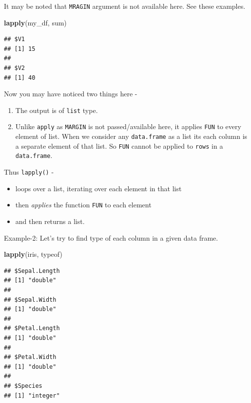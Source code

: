 \documentclass[
]{book}
\newenvironment{Shaded}{\begin{snugshade}}{\end{snugshade}}
\newcommand{\FunctionTok}[1]{\textcolor[rgb]{0.13,0.29,0.53}{\textbf{#1}}}
\newcommand{\NormalTok}[1]{#1}
\providecommand{\tightlist}{%
  \setlength{\itemsep}{0pt}\setlength{\parskip}{0pt}}
\begin{document}
It may be noted that \texttt{MRAGIN} argument is not available here. See these examples.

\begin{Shaded}
\begin{Highlighting}[]
\FunctionTok{lapply}\NormalTok{(my\_df, sum)}
\end{Highlighting}
\end{Shaded}

\begin{verbatim}
## $V1
## [1] 15
## 
## $V2
## [1] 40
\end{verbatim}

Now you may have noticed two things here -

\begin{enumerate}
\def\labelenumi{\arabic{enumi}.}
\tightlist
\item
  The output is of \texttt{list} type.
\item
  Unlike \texttt{apply} as \texttt{MARGIN} is not passed/available here, it applies \texttt{FUN} to every element of list. When we consider any \texttt{data.frame} as a list its each column is a separate element of that list. So \texttt{FUN} cannot be applied to \texttt{rows} in a \texttt{data.frame}.
\end{enumerate}

Thus \texttt{lapply()} -

\begin{itemize}
\tightlist
\item
  loops over a list, iterating over each element in that list
\item
  then \emph{applies} the function \texttt{FUN} to each element
\item
  and then returns a list.
\end{itemize}

Example-2: Let's try to find type of each column in a given data frame.

\begin{Shaded}
\begin{Highlighting}[]
\FunctionTok{lapply}\NormalTok{(iris, typeof)}
\end{Highlighting}
\end{Shaded}

\begin{verbatim}
## $Sepal.Length
## [1] "double"
## 
## $Sepal.Width
## [1] "double"
## 
## $Petal.Length
## [1] "double"
## 
## $Petal.Width
## [1] "double"
## 
## $Species
## [1] "integer"
\end{verbatim}
\end{document}
